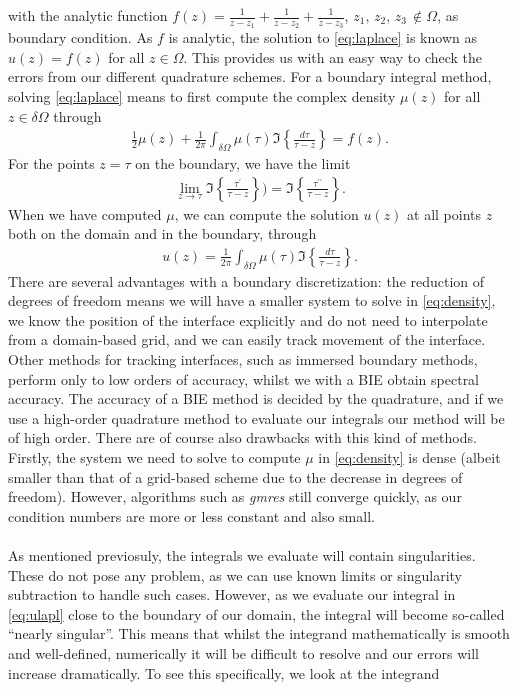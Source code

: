 \documentclass[a4paper,10pt]{article}
\begin{document}
with the analytic function $f(z)=\frac{1}{z-z_1}+\frac{1}{z-z_2} + \frac{1}{z-z_3}$, $z_1,\,z_2,\,z_3\,\notin\Omega$, as boundary condition. As $f$ is analytic, the solution to \eqref{eq:laplace} is known as $u(z)=f(z)$ for all $z\in\Omega$. This provides us with an easy way to check the errors from our different quadrature schemes. For a boundary integral method, solving \eqref{eq:laplace} means to first compute the complex density $\mu(z)$ for all $z\in\delta\Omega$ through
\begin{align}
	\frac{1}{2}\mu(z) + \frac{1}{2\pi}\int_{\delta\Omega} \mu(\tau) \Im\left\{ \frac{d\tau}{\tau-z}\right\} = f(z).
	\label{eq:density}
\end{align}
For the points $z = \tau$ on the boundary, we have the limit 
\begin{align*}
\lim_{z\rightarrow\tau} \Im\left\{ \frac{\tau^\prime}{\tau-z}\right\} ) = \Im\left\{ \frac{\tau^{\prime\prime}}{\tau-z} \right\}.
\end{align*}
When we have computed $\mu$, we can compute the solution $u(z)$ at all points $z$ both on the domain and in the boundary, through
\begin{align}
	u(z) = \frac{1}{2\pi} \int_{\delta\Omega} \mu(\tau) \Im\left\{ \frac{d\tau}{\tau-z} \right\}.
\label{eq:ulapl}
\end{align}
There are several advantages with a boundary discretization: the reduction of degrees of freedom means we will have a smaller system to solve in \eqref{eq:density}, we know the position of the interface explicitly and do not need to interpolate from a domain-based grid, and we can easily track movement of the interface. Other methods for tracking interfaces, such as immersed boundary methods, perform only to low orders of accuracy, whilst we with a BIE obtain spectral accuracy. The accuracy of a BIE method is decided by the quadrature, and if we use  a high-order quadrature method to evaluate our integrals our method will be of high order. There are of course also drawbacks with this kind of methods. Firstly, the system we need to solve to compute $\mu$ in \eqref{eq:density} is dense (albeit smaller than that of a grid-based scheme due to the decrease in degrees of freedom). However, algorithms such as \textit{gmres} still converge quickly, as our condition numbers are more or less constant and also small. 
\\ \\
As mentioned previosuly, the integrals we evaluate will contain singularities. These do not pose any problem, as we can use known limits or singularity subtraction to handle such cases. However, as we evaluate our integral in \eqref{eq:ulapl} close to the boundary of our domain, the integral will become so-called ``nearly singular''. This means that whilst the integrand mathematically is smooth and well-defined, numerically it will be difficult to resolve and our errors will increase dramatically. To see this specifically, we look at the integrand
\end{document}
